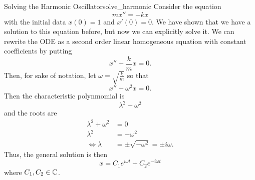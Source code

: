         \begin{ex}{Solving the Harmonic Oscillator}{solve_harmonic}
        Consider the equation
        \[
        mx''=-kx
        \]
        with the initial data $x(0)=1$ and $x'(0)=0$. We have shown that we have a solution to this equation before, but now we can explicitly solve it.  We can rewrite the ODE as a second order linear homogeneous equation with constant coefficients by putting
        \[
        x''+\frac{k}{m}x=0.
        \]
        Then, for sake of notation, let $\omega = \sqrt{\frac{k}{m}}$ so that
        \[
        x''+\omega^2x=0.
        \]
        Then the characteristic polynmomial is
        \[
        \lambda^2+\omega^2
        \]
        and the roots are
        \begin{align*}
            \lambda^2+\omega^2&=0\\
            \lambda^2&=-\omega^2\\
            \iff \lambda&= \pm \sqrt{-\omega^2}= \pm i \omega.
        \end{align*}
        Thus, the general solution is then
        \[
        x=C_1 e^{i\omega t}+C_2e^{-i\omega t}
        \]
        where $C_1,C_2\in \mathbb{C}$.


\end{ex}
